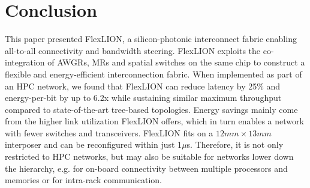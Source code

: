 \documentclass[journal]{IEEEtran}
\begin{document}
\section{Conclusion}
This paper presented FlexLION, a silicon-photonic interconnect fabric enabling all-to-all connectivity and bandwidth steering. FlexLION exploits the co-integration of AWGRs, MRs and spatial switches on the same chip to construct a flexible and energy-efficient interconnection fabric. When implemented as part of an HPC network, we found that FlexLION can reduce latency by 25\% and energy-per-bit  by up to 6.2x while sustaining similar maximum throughput compared to state-of-the-art tree-based topologies. Energy savings mainly come from the higher link utilization FlexLION offers, which in turn enables a network with fewer switches and transceivers. FlexLION fits on a $12mm \times 13mm$ interposer and can be reconfigured within just 1$\mu$s. Therefore, it is not only restricted to HPC networks, but may also be suitable for networks lower down the hierarchy, e.g. for on-board connectivity between multiple processors and memories or for intra-rack communication. 

\IEEEpeerreviewmaketitle



\end{document}

